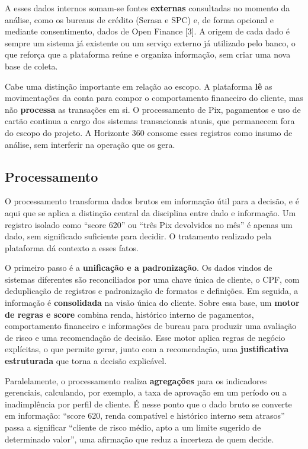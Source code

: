 \documentclass[12pt,a4paper]{article}
\begin{document}
A esses dados internos somam-se fontes \textbf{externas} consultadas no momento da an\'alise, como os bureaus de cr\'edito (Serasa e SPC) e, de forma opcional e mediante consentimento, dados de Open Finance [3]. A origem de cada dado \'e sempre um sistema j\'a existente ou um servi\c{c}o externo j\'a utilizado pelo banco, o que refor\c{c}a que a plataforma re\'une e organiza informa\c{c}\~ao, sem criar uma nova base de coleta.

Cabe uma distin\c{c}\~ao importante em rela\c{c}\~ao ao escopo. A plataforma \textbf{l\^e} as movimenta\c{c}\~oes da conta para compor o comportamento financeiro do cliente, mas n\~ao \textbf{processa} as transa\c{c}\~oes em si. O processamento de Pix, pagamentos e uso de cart\~ao continua a cargo dos sistemas transacionais atuais, que permanecem fora do escopo do projeto. A Horizonte 360 consome esses registros como insumo de an\'alise, sem interferir na opera\c{c}\~ao que os gera.

\subsection{Processamento}

O processamento transforma dados brutos em informa\c{c}\~ao \'util para a decis\~ao, e \'e aqui que se aplica a distin\c{c}\~ao central da disciplina entre dado e informa\c{c}\~ao. Um registro isolado como ``score 620'' ou ``tr\^es Pix devolvidos no m\^es'' \'e apenas um dado, sem significado suficiente para decidir. O tratamento realizado pela plataforma d\'a contexto a esses fatos.

O primeiro passo \'e a \textbf{unifica\c{c}\~ao e a padroniza\c{c}\~ao}. Os dados vindos de sistemas diferentes s\~ao reconciliados por uma chave \'unica de cliente, o CPF, com deduplica\c{c}\~ao de registros e padroniza\c{c}\~ao de formatos e defini\c{c}\~oes. Em seguida, a informa\c{c}\~ao \'e \textbf{consolidada} na vis\~ao \'unica do cliente. Sobre essa base, um \textbf{motor de regras e score} combina renda, hist\'orico interno de pagamentos, comportamento financeiro e informa\c{c}\~oes de bureau para produzir uma avalia\c{c}\~ao de risco e uma recomenda\c{c}\~ao de decis\~ao. Esse motor aplica regras de neg\'ocio expl\'icitas, o que permite gerar, junto com a recomenda\c{c}\~ao, uma \textbf{justificativa estruturada} que torna a decis\~ao explic\'avel.

Paralelamente, o processamento realiza \textbf{agrega\c{c}\~oes} para os indicadores gerenciais, calculando, por exemplo, a taxa de aprova\c{c}\~ao em um per\'iodo ou a inadimpl\^encia por perfil de cliente. \'E nesse ponto que o dado bruto se converte em informa\c{c}\~ao: ``score 620, renda compat\'ivel e hist\'orico interno sem atrasos'' passa a significar ``cliente de risco m\'edio, apto a um limite sugerido de determinado valor'', uma afirma\c{c}\~ao que reduz a incerteza de quem decide.
\end{document}
